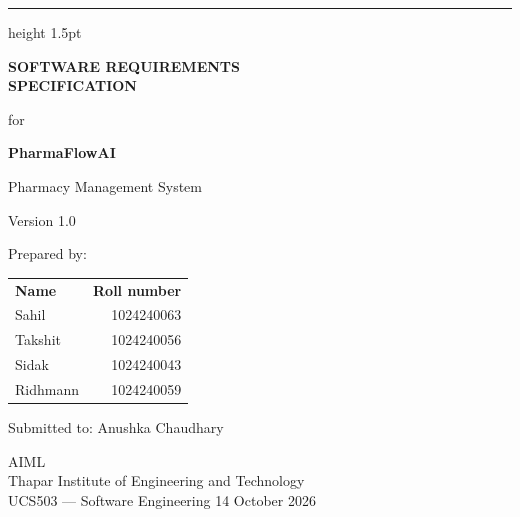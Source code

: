 \documentclass{article}
\makeatletter
\newcommand{\Project}{PharmaFlowAI}
\newcommand{\Authors}{\begin{tabular}{@{}lr@{}}
\textbf{Name} & \textbf{Roll number}\\
Sahil & 1024240063\\
Takshit & 1024240056\\
Sidak & 1024240043\\
Ridhmann & 1024240059
\end{tabular}}
\newcommand{\Institution}{Thapar Institute of Engineering and Technology}
\newcommand{\Department}{AIML}
\newcommand{\Supervisor}{Anushka Chaudhary}
\newcommand{\Course}{UCS503 --- Software Engineering}
\newcommand{\SubmissionDate}{14 October 2026}
\makeatother
\begin{document}
\begin{titlepage}
\thispagestyle{plain}
\vspace*{8mm}
\hrule height 1.5pt
\vspace{12mm}
\begin{flushright}
{\LARGE\bfseries SOFTWARE REQUIREMENTS\\[3pt]SPECIFICATION\par}
\vspace{12mm}
{\Large for\par}
\vspace{10mm}
{\LARGE\bfseries \Project\par}
\vspace{4mm}
{\large Pharmacy Management System\par}
\vspace{10mm}
{\large Version 1.0\par}
\vspace{8mm}
{\large Prepared by:\\[4pt]\Authors\par}
\vspace{8mm}
{\large Submitted to: \Supervisor\par}
\vspace{9mm}
\Department\\\Institution\\\Course
\vspace{12mm}
\SubmissionDate
\end{flushright}
\vfill
\end{titlepage}
\setcounter{page}{2}
\end{document}
